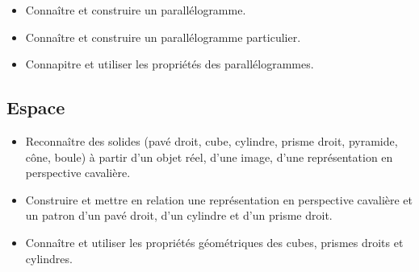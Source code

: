 \documentclass[a4paper,12pt,fleqn]{article}	
\begin{document}
\begin{itemize}
	\item {}Connaître et construire un parallélogramme.
	\item {}Connaître et construire un parallélogramme particulier.
	\item {}Connapitre et utiliser les propriétés des parallélogrammes.
\end{itemize}

\subsection*{Espace}

\begin{itemize}
	\item {}Reconnaître des solides (pavé droit, cube, cylindre, prisme droit, pyramide, cône, boule) à partir d’un objet réel, d’une image, d’une représentation en perspective cavalière.
	\item {}Construire et mettre en relation une représentation en perspective cavalière et un patron d’un pavé droit, d’un cylindre et d'un prisme droit.
    \item{}Connaître et utiliser les propriétés géométriques des cubes, prismes droits et cylindres.
\end{itemize}
	
\end{document}
